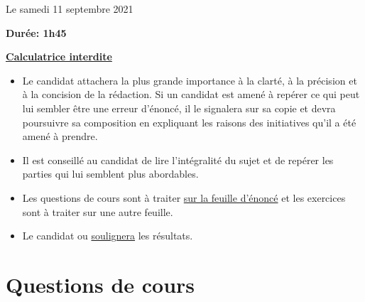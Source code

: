 \documentclass[twoside,french,11pt]{VcCours}
\begin{document}

\begin{center}
\large 
Le samedi 11 septembre 2021

\bigskip
\textbf{Durée: 1h45}

\bigskip
\large\underline{\textbf{Calculatrice interdite}}
\end{center}

\bigskip
\begin{itemize}
  \item Le candidat attachera la plus grande importance à la clarté, à la précision et à la concision de la rédaction. Si un candidat est amené à repérer ce qui peut lui sembler être une erreur d'énoncé, il le signalera sur sa copie et devra poursuivre sa composition en expliquant les raisons des initiatives qu'il a été amené à prendre.
  \item Il est conseillé au candidat de lire l'intégralité du sujet et de repérer les parties qui lui semblent plus abordables.
  \item Les questions de cours sont à traiter \underline{sur la feuille d'énoncé} et les exercices sont à traiter sur une autre feuille.
  \item Le candidat  ou \underline{soulignera} les résultats. 
  \end{itemize}
\separationTitre


\section*{Questions de cours}
\end{document}
